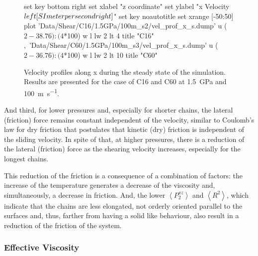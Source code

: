 \documentclass[aps,prb,reprint,superscriptaddress, a4paper]{revtex4-1}
\begin{document}
\begin{figure}
    	\begin{center}
		\begin{gnuplot}[terminal=pdf, terminaloptions={size \SERFigwidth cm, \SERFigheight cm color solid}]
			set key bottom right
			set xlabel "z coordinate"  
			set ylabel "x Velocity $\\left[ \\SI{}{\\meter\\per\\second} \\right]$"
			set key noautotitle
			set xrange [-50:50]
			plot  	'Data/Shear/C16/1.5GPa/100m_s2/vel_prof_x_s.dump' u ($2-38.76):($4*100) w l lw 2   lt 4  title "C16" ,\
				  	'Data/Shear/C60/1.5GPa/100m_s3/vel_prof_x_s.dump' u ($2-36.76):($4*100) w l lw 2   lt 10  title "C60" 
		\end{gnuplot}
		\caption{Velocity profiles along x  during the steady state of the simulation. Results are presented for the case of  C16 and C60 at   \SI{1.5}{\giga\pascal} and  \SI{100}{\meter\per\second}. }
		\label{fig:VelProfFL}
	\end{center}
 \end{figure}


And third, for lower pressures and, especially for shorter chains, the lateral (friction) force remains constant independent of the velocity, similar to  Coulomb's law for dry friction that postulates that kinetic (dry) friction is independent of the sliding velocity. In spite of that,  at higher pressures, there is a reduction of the lateral (friction) force as the shearing velocity  increases, especially for the longest chains.  


This reduction of the friction is a consequence of a combination of factors: the increase of the temperature generates a decrease of the viscosity and, simultaneously, a decrease in friction.   And, the lower $\left<P_{2}^{xz} \right> $  and $\left< R^2 \right>$, which indicate that the chains are  less elongated, not orderly  oriented parallel to the surfaces and, thus, farther from having a solid like behaviour, also result in a reduction of the friction of the system.


\subsubsection{Effective Viscosity}
\end{document}
